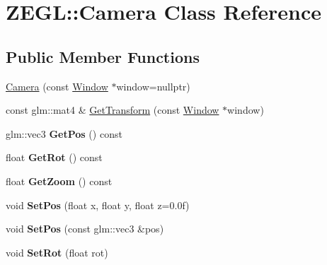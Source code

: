 \hypertarget{class_z_e_g_l_1_1_camera}{}\section{Z\+E\+G\+L\+:\+:Camera Class Reference}
\label{class_z_e_g_l_1_1_camera}
\subsection*{Public Member Functions}
\begin{DoxyCompactItemize}
\item 
\hyperlink{class_z_e_g_l_1_1_camera_afe162528fc9249f540aa772c0d1c22c9}{Camera} (const \hyperlink{class_z_e_g_l_1_1_window}{Window} $\ast$window=nullptr)
\item 
const glm\+::mat4 \& \hyperlink{class_z_e_g_l_1_1_camera_ad39df4bd961d2debd682f87f657f9614}{Get\+Transform} (const \hyperlink{class_z_e_g_l_1_1_window}{Window} $\ast$window)
\item 
\hypertarget{class_z_e_g_l_1_1_camera_a0dbdf23ce58ffee1a5a7fcfe7672f1cc}{}glm\+::vec3 {\bfseries Get\+Pos} () const \label{class_z_e_g_l_1_1_camera_a0dbdf23ce58ffee1a5a7fcfe7672f1cc}

\item 
\hypertarget{class_z_e_g_l_1_1_camera_adda8a25f5ba68c3dba29334659a66652}{}float {\bfseries Get\+Rot} () const \label{class_z_e_g_l_1_1_camera_adda8a25f5ba68c3dba29334659a66652}

\item 
\hypertarget{class_z_e_g_l_1_1_camera_ae90bbfb4a99f096269973a524a3697d8}{}float {\bfseries Get\+Zoom} () const \label{class_z_e_g_l_1_1_camera_ae90bbfb4a99f096269973a524a3697d8}

\item 
\hypertarget{class_z_e_g_l_1_1_camera_a3e4d6e95cf1c0357937de4b515f88b6b}{}void {\bfseries Set\+Pos} (float x, float y, float z=0.\+0f)\label{class_z_e_g_l_1_1_camera_a3e4d6e95cf1c0357937de4b515f88b6b}

\item 
\hypertarget{class_z_e_g_l_1_1_camera_a8fc756cc489101cddbf7e6e36322895f}{}void {\bfseries Set\+Pos} (const glm\+::vec3 \&pos)\label{class_z_e_g_l_1_1_camera_a8fc756cc489101cddbf7e6e36322895f}

\item 
\hypertarget{class_z_e_g_l_1_1_camera_a1c44b901139b76428955637d7eeb000b}{}void {\bfseries Set\+Rot} (float rot)\label{class_z_e_g_l_1_1_camera_a1c44b901139b76428955637d7eeb000b}


\end{DoxyCompactItemize}
